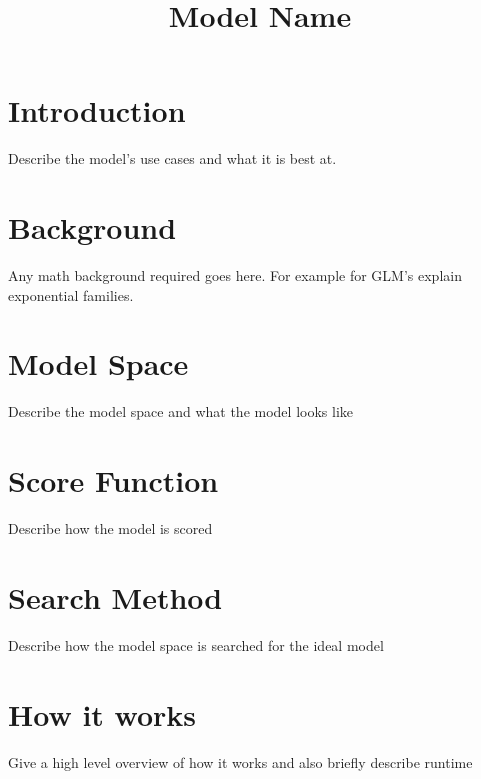 \documentclass{article}
\title{Model Name}
\begin{document}
\maketitle

\section{Introduction}

Describe the model's use cases and what it is best at. 

\section{Background}

Any math background required goes here. For example for GLM's explain exponential families.

\section{Model Space}

Describe the model space and what the model looks like

\section{Score Function}

Describe how the model is scored


\section{Search Method}

Describe how the model space is searched for the ideal model

\section{How it works}

Give a high level overview of how it works and also briefly describe runtime
\end{document}
